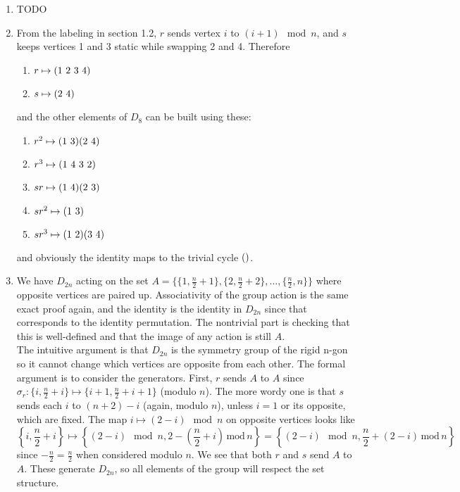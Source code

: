 \documentclass[]{article}
\newcommand{\md}{\,\text{mod}\,}
\newcommand*{\cycle}[1]{( \foreach \entry [count=\i] in {#1} {\ifnum\i>1\ \fi\entry})}
\begin{document}
\begin{enumerate}
\item {\color{red} TODO}


\item From the labeling in section 1.2, $r$ sends vertex $i$ to $(i+1)\!\mod n$, and $s$ keeps vertices 1 and 3 static while swapping 2 and 4. Therefore
\begin{enumerate}
\item $r \mapsto \cycle{1,2,3,4}$
\item $s \mapsto \cycle{2,4}$
\end{enumerate}
and the other elements of $D_8$ can be built using these:
\begin{enumerate}
\item $r^2 \mapsto \cycle{1,3}\cycle{2,4}$
\item $r^3 \mapsto \cycle{1,4,3,2}$
\item $sr \mapsto \cycle{1,4}\cycle{2,3}$
\item $sr^2 \mapsto \cycle{1,3}$
\item $sr^3 \mapsto \cycle{1,2}\cycle{3,4}$
\end{enumerate}
and obviously the identity maps to the trivial cycle $\cycle{}$.


\item We have $D_{2n}$ acting on the set $A = \{ \{1,\frac{n}{2}+1\}, \{2,\frac{n}{2}+2\}, \ldots, \{\frac{n}{2},n\} \}$ where opposite vertices are paired up. Associativity of the group action is the same exact proof again, and the identity is the identity in $D_{2n}$ since that corresponds to the identity permutation. The nontrivial part is checking that this is well-defined and that the image of any action is still $A$. \\
The intuitive argument is that $D_{2n}$ is the symmetry group of the rigid n-gon so it cannot change which vertices are opposite from each other. The formal argument is to consider the generators. First, $r$ sends $A$ to $A$ since $\sigma_r: \{i,\frac{n}{2}+i\} \mapsto \{i+1,\frac{n}{2}+i+1\}$ (modulo $n$). The more wordy one is that $s$ sends each $i$ to $(n+2)-i$ (again, modulo $n$), unless $i=1$ or its opposite, which are fixed. The map $i \mapsto (2-i)\!\!\!\mod n$ on opposite vertices looks like
\begin{equation}
\left\{i,\frac{n}{2}+i\right\} \mapsto \left\{(2-i)\!\!\!\!\mod n,2-\left(\frac{n}{2}+i\right)\md n\right\} = \left\{(2-i)\!\!\!\!\mod n,\frac{n}{2} + \left( 2-i \right)\!\md n\right\}
\end{equation}
since $-\frac{n}{2} = \frac{n}{2}$ when considered modulo $n$. We see that both $r$ and $s$ send $A$ to $A$. These generate $D_{2n}$, so all elements of the group will respect the set structure.



\end{enumerate}
\end{document}
